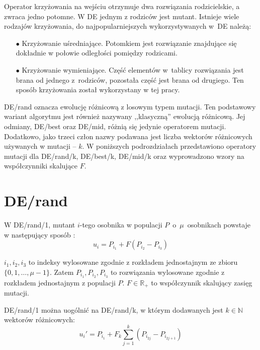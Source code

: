 \documentclass[a4paper,onecolumn,oneside,11pt,wide,floatssmall]{mwrep}
\theoremstyle{definition}
\theoremstyle{plain}%
\theoremstyle{remark}
\begin{document}
Operator krzyżowania na wejściu otrzymuje dwa rozwiązania rodzicielskie, a zwraca jedno potomne. 
W DE jednym z rodziców jest mutant. Istnieje wiele rodzajów krzyżowania, do najpopularniejszych 
wykorzystywanych w DE należą:
\begin{itemize} 
 \item[$\bullet$] Krzyżowanie uśredniające. 
Potomkiem jest rozwiązanie znajdujące się dokładnie w połowie odległości pomiędzy rodzicami.
 \item[$\bullet$]  Krzyżowanie wymieniające. 
Część elementów w tablicy rozwiązania jest brana od jednego z rodziców, 
pozostała część jest brana od drugiego. Ten sposób krzyżowania został wykorzystany w tej pracy.
\end{itemize} 

DE/rand oznacza ewolucję różnicową z losowym typem mutacji.
Ten podstawowy wariant algorytmu jest również nazywany ,,klasyczną'' ewolucją różnicową. 
Jej odmiany, DE/best oraz DE/mid, różnią się jedynie operatorem mutacji.
Dodatkowo, jako trzeci człon nazwy podawana jest liczba wektorów różnicowych używanych w mutacji -- $k$.
W poniższych podrozdziałach przedstawiono operatory mutacji dla DE/rand/k, DE/best/k, DE/mid/k 
oraz wyprowadzono wzory na współczynniki skalujące $F$.

\section{DE/rand}
\label{chap:de_rand} 

W DE/rand/1, mutant $i$-tego osobnika w populacji $P$~o~$\mu$~osobnikach powstaje w następujący sposób 
\cite{decomposition}:
\begin{equation} \label{eq:derand1}
u_i = P_{i_1} + F(P_{i_2} - P_{i_3})
\end{equation}

$i_1, i_2, i_3$ to indeksy wylosowane zgodnie z rozkładem jednostajnym ze zbioru \\ 
$\{0, 1, \dots, \mu-1\}$. Zatem $P_{i_1}, P_{i_2}, P_{i_3}$ to rozwiązania wylosowane zgodnie z rozkładem jednostajnym z populacji $P$.
$F\in\mathbb{R_+}$ to współczynnik skalujący zasięg mutacji. 

DE/rand/1 można uogólnić na DE/rand/k, w którym dodawanych jest
$k \in \mathbb{N}$ wektorów różnicowych:
\begin{equation} \label{eq:derand}
u_i' = P_{i_1} + F_k\sum\limits_{j=1}^k (P_{i_{2j}} - P_{i_{2j+1}})
\end{equation}
\end{document}
